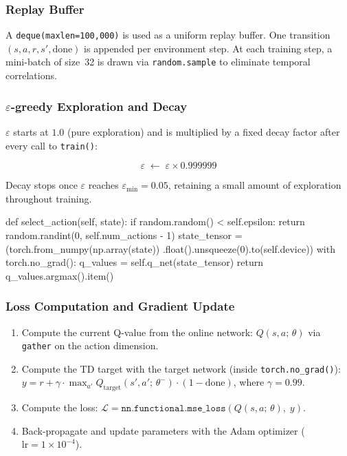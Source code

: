 \documentclass[12pt,a4paper]{report}
\begin{document}
\subsubsection*{Replay Buffer}

A \texttt{deque(maxlen=100{,}000)} is used as a uniform replay buffer.
One transition $(s, a, r, s', \text{done})$ is appended per environment step.
At each training step, a mini-batch of size~32 is drawn via \texttt{random.sample}
to eliminate temporal correlations.

\subsubsection*{$\varepsilon$-greedy Exploration and Decay}

$\varepsilon$ starts at $1.0$ (pure exploration) and is multiplied by a fixed decay factor
after every call to \texttt{train()}:

\[
  \varepsilon \;\leftarrow\; \varepsilon \times 0.999999
\]

Decay stops once $\varepsilon$ reaches $\varepsilon_{\min} = 0.05$,
retaining a small amount of exploration throughout training.

\begin{pycode}
def select_action(self, state):
    if random.random() < self.epsilon:
        return random.randint(0, self.num_actions - 1)
    state_tensor = (torch.from_numpy(np.array(state))
                        .float().unsqueeze(0).to(self.device))
    with torch.no_grad():
        q_values = self.q_net(state_tensor)
    return q_values.argmax().item()
\end{pycode}

\subsubsection*{Loss Computation and Gradient Update}

\begin{enumerate}[leftmargin=2em]
  \item Compute the current Q-value from the online network:
        $Q(s,a;\,\theta)$ via \texttt{gather} on the action dimension.
  \item Compute the TD target with the target network (inside \texttt{torch.no\_grad()}):
        $y = r + \gamma \cdot \max_{a'} Q_{\text{target}}(s',a';\,\theta^-) \cdot (1 - \text{done})$,
        where $\gamma = 0.99$.
  \item Compute the loss:
        $\mathcal{L} = \texttt{nn.functional.mse\_loss}(Q(s,a;\,\theta),\; y)$.
  \item Back-propagate and update parameters with the Adam optimizer
        ($\text{lr} = 1\times 10^{-4}$).
\end{enumerate}
\end{document}
